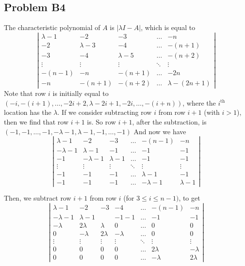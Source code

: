\documentclass{article}
\begin{document}
\subsection{Problem B4}
The characteristic polynomial of $A$ is $|\lambda I - A|$, which is equal to 
\[
\left|
\begin{array}{ccccc}
\lambda - 1 & -2 & -3 & \dots & -n\\
-2 & \lambda - 3 & -4 & \dots & -(n+1)\\
-3 & -4 & \lambda -5 & \dots & -(n+2)\\
\vdots & \vdots & \vdots & \ddots & \vdots\\
-(n-1) & -n & -(n+1) & \dots & -2n\\
-n & -(n+1) & -(n+2) & \dots & \lambda -(2n + 1)
\end{array}
\right|
\]
Note that row $i$ is initially equal to
$(-i, -(i+1),\dots,-2i + 2, \lambda - 2i +1, -2i,\dots, -(i + n))$,
where the $i^{\text{th}}$ location has the $\lambda$.
If we consider subtracting row $i$ from row $i+1$ (with $i > 1$), then we find that row $i+1$ is.
So row $i+1$, after the subtraction, is 
$(-1, -1, \dots, -1, -\lambda -1, \lambda - 1, -1, \dots, -1)$
And now we have
\[
\left|
\begin{array}{cccccc}
\lambda - 1 & -2 & -3 & \dots & -(n-1)& -n\\
-\lambda - 1 & \lambda - 1 & -1 & \dots & -1 & -1\\
-1 & -\lambda - 1 & \lambda - 1 & \dots & -1 & -1\\
\vdots & \vdots & \vdots & \ddots & \vdots & \vdots\\
-1 & -1 & -1 & \dots & \lambda -1 & -1 \\
-1 & -1 & -1 & \dots & -\lambda - 1 & \lambda -1
\end{array}
\right|
\]

Then, we subtract row $i + 1$ from row $i$ (for $3 \leq i \leq n-1)$, to get
\[
\left|
\begin{array}{cccccccc}
\lambda - 1 & -2 & -3 & -4 & \dots & -(n-1)& -n\\
-\lambda - 1 & \lambda - 1 & & -1 -1 & \dots & -1 & -1\\
-\lambda  & 2 \lambda & \lambda & 0 & \dots & 0 & 0\\
0 & -\lambda & 2\lambda & -\lambda & \dots & 0 & 0\\
\vdots & \vdots & \vdots & \vdots & \ddots & \vdots & \vdots\\
0 & 0 & 0 &  0 &\dots & 2\lambda  & -\lambda \\
0 & 0 & 0 & 0 & \dots & -\lambda & 2\lambda
\end{array}
\right|
\]
\end{document}
